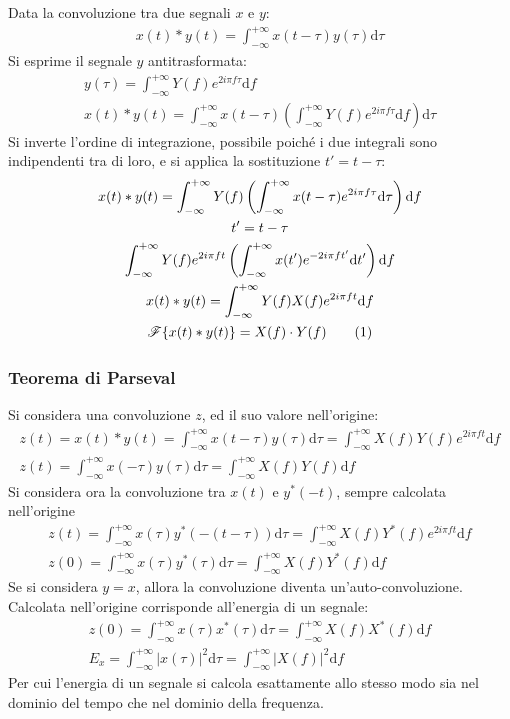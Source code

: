 \documentclass{article}
\newcommand{\df}{\mathrm{d}}
\newcommand{\tageq}{\tag{\stepcounter{equation}\theequation}}
\numberwithin{equation}{subsection}
\begin{document}
Data la convoluzione tra due segnali $x$ e $y$:
\begin{gather*}
    x(t)*y(t)=\displaystyle\int_{-\infty}^{+\infty}x(t-\tau)y(\tau)\df\tau
\end{gather*}
Si esprime il segnale $y$ antitrasformata:
\begin{gather*}
    y(\tau)=\displaystyle\int_{-\infty}^{+\infty}Y(f)e^{2i\pi f\tau}\df f\\
    x(t)*y(t)=\displaystyle\int_{-\infty}^{+\infty}x(t-\tau)\left(\int_{-\infty}^{+\infty}Y(f)e^{2i\pi f\tau}\df f\right)\df\tau
\end{gather*}
Si inverte l'ordine di integrazione, possibile poiché i due integrali sono indipendenti tra di loro, e si applica la sostituzione $t'=t-\tau$: 
\begin{gather*}
    x(t)*y(t)=\displaystyle\int_{-\infty}^{+\infty}Y(f)\left(\int_{-\infty}^{+\infty}x(t-\tau)e^{2i\pi f\tau}\df\tau\right)\df f\\
    t'=t-\tau\\
    \int_{-\infty}^{+\infty}Y(f)e^{2i\pi ft}\left(\int_{-\infty}^{+\infty}x(t')e^{-2i\pi ft'}\df t'\right)\df f\\
    x(t)*y(t)=\displaystyle\int_{-\infty}^{+\infty}Y(f)X(f)e^{2i\pi ft}\df f\\
    \mathscr{F}\{x(t)*y(t)\}=X(f)\cdot Y(f)\tageq
\end{gather*}

\subsubsection{Teorema di Parseval}

Si considera una convoluzione $z$, ed il suo valore nell'origine:
\begin{gather*}
    z(t)=x(t)*y(t)=\displaystyle\int_{-\infty}^{+\infty}x(t-\tau)y(\tau)\df\tau=\int_{-\infty}^{+\infty}X(f)Y(f)e^{2i\pi ft}\df f\\
    z(t)=\displaystyle\int_{-\infty}^{+\infty}x(-\tau)y(\tau)\df\tau=\int_{-\infty}^{+\infty}X(f)Y(f)\df f 
\end{gather*}
Si considera ora la convoluzione tra $x(t)$ e $y^*(-t)$, sempre calcolata nell'origine
\begin{gather*}
    z(t)=\displaystyle\int_{-\infty}^{+\infty}x(\tau)y^*(-(t-\tau))\df\tau=\int_{-\infty}^{+\infty}X(f)Y^*(f)e^{2i\pi ft}\df f\\
    z(0)=\displaystyle\int_{-\infty}^{+\infty}x(\tau)y^*(\tau)\df\tau=\int_{-\infty}^{+\infty}X(f)Y^*(f)\df f
\end{gather*}
Se si considera $y=x$, allora la convoluzione diventa un'auto-convoluzione. Calcolata nell'origine corrisponde all'energia di un segnale:
\begin{gather*}
    z(0)=\displaystyle\int_{-\infty}^{+\infty}x(\tau)x^*(\tau)\df\tau=\int_{-\infty}^{+\infty}X(f)X^*(f)\df f\\
    E_x=\displaystyle\int_{-\infty}^{+\infty}|x(\tau)|^2\df\tau=\int_{-\infty}^{+\infty}|X(f)|^2\df f
\end{gather*}
Per cui l'energia di un segnale si calcola esattamente allo stesso modo sia nel dominio del tempo che nel dominio della frequenza. 
\end{document}

